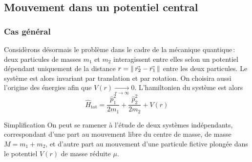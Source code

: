     \subsection{Mouvement dans un potentiel central}

        \subsubsection{Cas général}

    Considèrons désormais le problème dans le cadre de la mécanique quantique : deux particules de masses $m_1$ et $m_2$ interagissent entre elles selon un potentiel dépendant uniquement de la distance $r = \left\lVert \, \vec{r_2} - \vec{r_1} \, \right\rVert$ entre les deux particules. Le système est alors invariant par translation et par rotation. On choisira aussi l’origine des énergies afin que $V(r) \underset{r \to \infty}{\longrightarrow} 0$. L’hamiltonien du système est alors 
    \[ \hat{H}_{\text{tot}} = \frac{\hat{p}_1^2}{2m_1} + \frac{\hat{p}_2^2}{2 m_2} + V(r) \]   

    \begin{omed}{Simplification}
        On peut se ramener à l’étude de deux systèmes indépendants, correspondant d’une part au mouvement libre du centre de masse, de masse $M = m_1 + m_2$, et d’autre part au mouvement d’une particule fictive plongée dans le potentiel $V(r)$ de masse réduite $\mu$.
    \end{omed}

